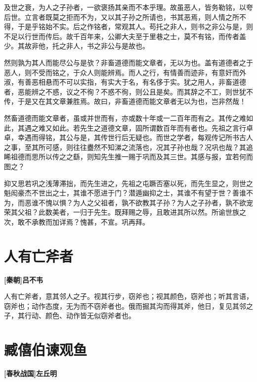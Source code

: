 \documentclass[UTF8,titlepage,oneside]{ctexbook}
\begin{document}
及世之衰，为人之子孙者，一欲褒扬其亲而不本乎理。故虽恶人，皆务勒铭，以夸后世。立言者既莫之拒而不为，又以其子孙之所请也，书其恶焉，则人情之所不得，于是乎铭始不实。后之作铭者，常观其人。苟托之非人，则书之非公与是，则不足以行世而传后。故千百年来，公卿大夫至于里巷之士，莫不有铭，而传者盖少。其故非他，托之非人，书之非公与是故也。


然则孰为其人而能尽公与是欤？非畜道德而能文章者，无以为也。盖有道德者之于恶人，则不受而铭之，于众人则能辨焉。而人之行，有情善而迹非，有意奸而外淑，有善恶相悬而不可以实指，有实大于名，有名侈于实。犹之用人，非畜道德者，恶能辨之不惑，议之不徇？不惑不徇，则公且是矣。而其辞之不工，则世犹不传，于是又在其文章兼胜焉。故曰，非畜道德而能文章者无以为也，岂非然哉！


然畜道德而能文章者，虽或并世而有，亦或数十年或一二百年而有之。其传之难如此，其遇之难又如此。若先生之道德文章，固所谓数百年而有者也。先祖之言行卓卓，幸遇而得铭，其公与是，其传世行后无疑也。而世之学者，每观传记所书古人之事，至其所可感，则往往衋然不知涕之流落也，况其子孙也哉？况巩也哉？其追睎祖德而思所以传之之繇，则知先生推一赐于巩而及其三世。其感与报，宜若何而图之？


抑又思若巩之浅薄滞拙，而先生进之，先祖之屯蹶否塞以死，而先生显之，则世之魁闳豪杰不世出之士，其谁不愿进于门？潜遁幽抑之士，其谁不有望于世？善谁不为，而恶谁不愧以惧？为人之父祖者，孰不欲教其子孙？为人之子孙者，孰不欲宠荣其父祖？此数美者，一归于先生。既拜赐之辱，且敢进其所以然。所谕世族之次，敢不承教而加详焉？愧甚，不宣。巩再拜。



\chapter*{人有亡斧者}
\begin{center}
	\textbf{[秦朝]吕不韦}
\end{center}


人有亡斧者，意其邻人之子。视其行步，窃斧也；视其颜色，窃斧也；听其言语，窃斧也；动作态度，无为而不窃斧者也。俄而掘其沟而得其斧，他日，复见其邻之子，其行动、颜色、动作皆无似窃斧者也。

\chapter*{臧僖伯谏观鱼}
\begin{center}
	\textbf{[春秋战国]左丘明}
\end{center}
\end{document}
